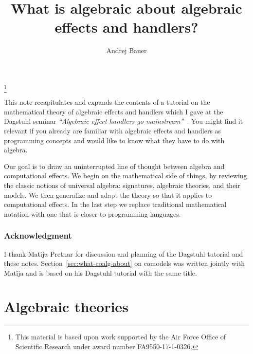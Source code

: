\documentclass{amsart}
\begin{document}
\title{What is algebraic about algebraic effects and handlers?}

\author{Andrej Bauer}
\address{Andrej Bauer\\
Faculty of mathematics and Physics\\
University of Ljubljana\\
Jadranska 19\\
1000 Ljubljana\\
Slovenia}
\thanks{This material is based upon work supported by the Air Force Office of
  Scientific Research under award number FA9550-17-1-0326.}

\maketitle

This note recapitulates and expands the contents of a tutorial on the
mathematical theory of algebraic effects and handlers which I gave at the
Dagstuhl seminar \emph{``Algebraic effect handlers go
  mainstream''}~\cite{chandrasekaran18:_algeb}. You might find it relevant if
you already are familiar with algebraic effects and handlers as programming
concepts and would like to know what they have to do with algebra.

Our goal is to draw an uninterrupted line of thought between algebra and
computational effects. We begin on the mathematical side of things, by reviewing
the classic notions of universal algebra: signatures, algebraic theories, and
their models. We then generalize and adapt the theory so that it applies to
computational effects. In the last step we replace traditional mathematical
notation with one that is closer to programming languages.

\subsubsection*{Acknowledgment}

I thank Matija Pretnar for discussion and planning of the Dagstuhl tutorial and
these notes. Section~\ref{sec:what-coalg-about} on comodels was written jointly
with Matija and is based on his Dagstuhl tutorial with the same title.


\section{Algebraic theories}
\label{sec:algebraic-theories}
\end{document}
